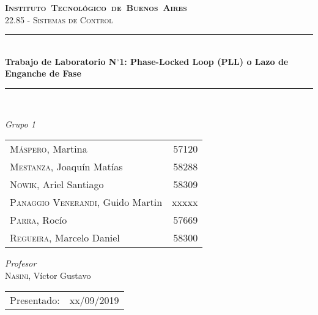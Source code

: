 \begin{titlepage}
\newcommand{\HRule}{\rule{\linewidth}{0.5mm}}
\center
\mbox{\textsc{\LARGE \bfseries {Instituto Tecnol\'ogico de Buenos Aires}}}\\[1.5cm]
\textsc{\Large 22.85 - Sistemas de Control}\\[0.5cm]


\HRule \\[0.6cm]
{ \Huge \bfseries Trabajo de Laboratorio N$^{\circ}$1: Phase-Locked Loop (PLL) o Lazo de Enganche de Fase}\\[0.4cm] %
\HRule \\[1.5cm]


{\large

\emph{Grupo 1}\\
\vspace{3px}

\begin{tabular}{lr} 	
\textsc{M\'aspero}, Martina  & 57120 \\
\textsc{Mestanza}, Joaqu\'in Mat\'ias  & 58288 \\
\textsc{Nowik}, Ariel Santiago  & 58309 \\
\textsc{Panaggio Venerandi}, Guido Martin  & xxxxx \\
\textsc{Parra}, Roc\'io  & 57669 \\
\textsc{Regueira}, Marcelo Daniel  & 58300 \\

\end{tabular}

\vspace{20px}

\emph{Profesor}\\
\vspace{3px}
\textsc{Nasini}, V\'ictor Gustavo\\ 	
\vspace{100px}

\begin{tabular}{ll}

Presentado: & xx/09/2019\\

\end{tabular}

}

\vfill

\end{titlepage}